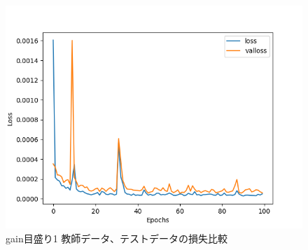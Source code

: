 \documentclass{jreport}		%
\begin{document}
\begin{figure}[htbp]
 \begin{center}
  \includegraphics[width=150mm]{gain1_loss_hikaku.png}
 \end{center}
 \caption{gain目盛り1 教師データ、テストデータの損失比較}
 \label{fig:one}
\end{figure}
\end{document}
